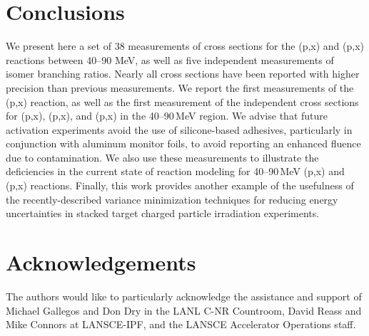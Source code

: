 \documentclass[3p]{elsarticle}
\newcommand{\comment}[1]{\todo[color=blue!20!white,inline]{ASV: #1}}
\begin{document}
          





 
 
 
 
 \section{Conclusions}

We present here a set of 38 measurements of cross sections for the (p,x) and  (p,x) reactions between 40--90 MeV, as well as five independent measurements of isomer branching ratios.
Nearly all cross sections have been reported with higher precision than previous measurements.
We report the first measurements of the  (p,x) reaction, as well as the first measurement of the independent cross sections for    (p,x), (p,x), and (p,x) in the 40--90\,MeV region.
We advise that future activation experiments avoid the use of silicone-based adhesives, particularly in conjunction with aluminum monitor foils, to avoid reporting an enhanced fluence due to  contamination.
We also use these measurements to illustrate the deficiencies in the current state of  reaction modeling for 40--90\,MeV (p,x) and  (p,x) reactions.
Finally, this work provides another example of the usefulness of the recently-described variance minimization techniques for reducing energy uncertainties in stacked target charged particle irradiation experiments.


 
 \section{Acknowledgements}
 
 
 The authors would like to particularly acknowledge the assistance and support of  Michael Gallegos and Don Dry in the LANL C-NR Countroom, David Reass and Mike Connors at LANSCE-IPF, and the LANSCE Accelerator Operations staff. 
 
\end{document}
